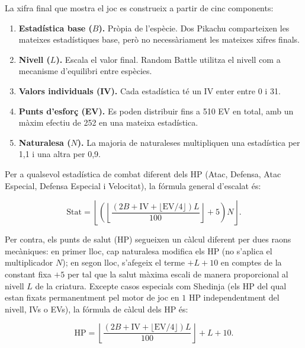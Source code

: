 La xifra final que mostra el joc es construeix a partir de cinc components:
\begin{enumerate}
    \item \textbf{Estadística base ($B$).} Pròpia de l'espècie. Dos Pikachu comparteixen les mateixes estadístiques base, però no necessàriament les mateixes xifres finals.
    \item \textbf{Nivell ($L$).} Escala el valor final. Random Battle utilitza el nivell com a mecanisme d'equilibri entre espècies.
    \item \textbf{Valors individuals (IV).} Cada estadística té un IV enter entre 0 i 31.
    \item \textbf{Punts d'esforç (EV).} Es poden distribuir fins a 510 EV en total, amb un màxim efectiu de 252 en una mateixa estadística.
    \item \textbf{Naturalesa ($N$).} La majoria de naturaleses multipliquen una estadística per 1,1 i una altra per 0,9.
\end{enumerate}

Per a qualsevol estadística de combat diferent dels HP (Atac, Defensa, Atac Especial, Defensa Especial i Velocitat), la fórmula general d'escalat és:

\vspace{16pt}
{\large
    \begin{equation}
        \mathrm{Stat} =
        \left\lfloor
        \left(
        \left\lfloor
        \frac{(2B+\mathrm{IV}+\lfloor \mathrm{EV}/4\rfloor)L}{100}
        \right\rfloor + 5
        \right)N
        \right\rfloor .
        \label{eq:stat_formula}
    \end{equation}
}
\vspace{16pt}

Per contra, els punts de salut (HP) segueixen un càlcul diferent per dues raons mecàniques: en primer lloc, cap naturalesa modifica els HP (no s'aplica el multiplicador $N$); en segon lloc, s'afegeix el terme $+L + 10$ en comptes de la constant fixa $+5$ per tal que la salut màxima escali de manera proporcional al nivell $L$ de la criatura. Excepte casos especials com Shedinja (els HP del qual estan fixats permanentment pel motor de joc en $1$ HP independentment del nivell, IVs o EVs), la fórmula de càlcul dels HP és:

\vspace{16pt}
{\large
    \begin{equation}
        \mathrm{HP} =
        \left\lfloor
        \frac{(2B+\mathrm{IV}+\lfloor \mathrm{EV}/4\rfloor)L}{100}
        \right\rfloor + L + 10 .
        \label{eq:hp_formula}
    \end{equation}
}
\vspace{16pt}

\vspace{12pt}

